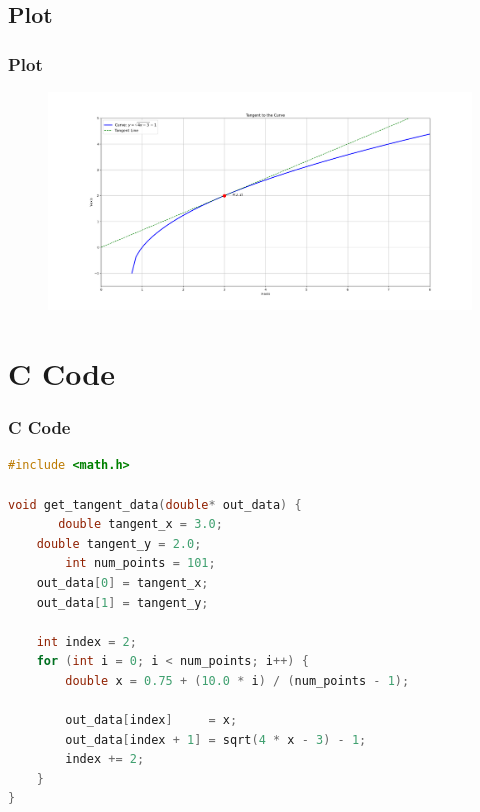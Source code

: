 \documentclass{beamer}
\theoremstyle{remark}
\numberwithin{equation}{section}
\begin{document}
\subsection{Plot}
\begin{frame}[fragile]
\frametitle{Plot}

\begin{figure}[h!]
   \centering
   \includegraphics[width=0.9\columnwidth]{figs/fig1.png}
	\caption{}
   \label{}
\end{figure}
\end{frame}

\section{C Code}
\begin{frame}[fragile]
\frametitle{C Code}
\begin{lstlisting}[language=C]
#include <math.h>

void get_tangent_data(double* out_data) {
       double tangent_x = 3.0;
    double tangent_y = 2.0;
        int num_points = 101;
    out_data[0] = tangent_x;
    out_data[1] = tangent_y;

    int index = 2;
    for (int i = 0; i < num_points; i++) {
        double x = 0.75 + (10.0 * i) / (num_points - 1);

        out_data[index]     = x;
        out_data[index + 1] = sqrt(4 * x - 3) - 1;
        index += 2;
    }
}


    \end{lstlisting}
\end{frame}
\end{document}
